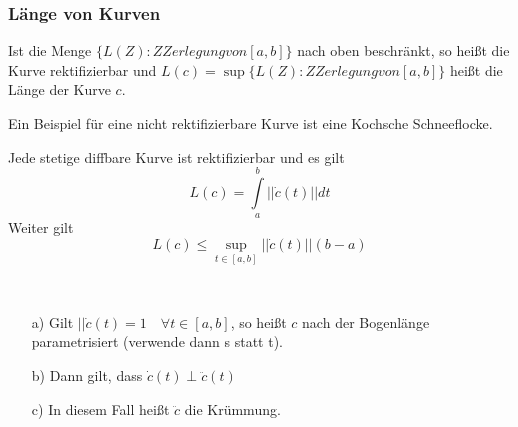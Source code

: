 	  \subsubsection{Länge von Kurven}
	  \begin{definition}
	    Ist die Menge $\lbrace L(Z): Z Zerlegung von [a,b] \rbrace$ nach oben beschränkt, so heißt die Kurve rektifizierbar und $L(c) = \sup \lbrace L(Z): Z Zerlegung von [a,b]\rbrace$ heißt die Länge der Kurve $c$.
	  \end{definition}
	  \begin{bem}
	    Ein Beispiel für eine nicht rektifizierbare Kurve ist eine Kochsche Schneeflocke.
	  \end{bem}
	  \begin{satz}
	    Jede stetige diffbare Kurve ist rektifizierbar und es gilt 
	    \begin{equation}
	      L(c) = \int\limits_a^b ||\dot{c}(t)|| dt
	    \end{equation}
	    Weiter gilt
	    \begin{equation}
	      L(c) \leq \sup\limits_{t \in [a,b]} || \dot{c}(t)|| (b-a)
	    \end{equation}
	  \end{satz}
	  \begin{bem}$\;$\newline
	    \begin{itemize}
	      \item[a) ] Gilt $||\dot{c}(t) = 1 \quad \forall  t \in [a,b]$, so heißt $c$ nach der Bogenlänge parametrisiert (verwende dann s statt t).
	      \item[b) ] Dann gilt, dass $\dot{c}(t) \perp \ddot{c}(t)$
	      \item[c) ] In diesem Fall heißt $\ddot{c}$ die Krümmung.
	    \end{itemize}
	  \end{bem}
